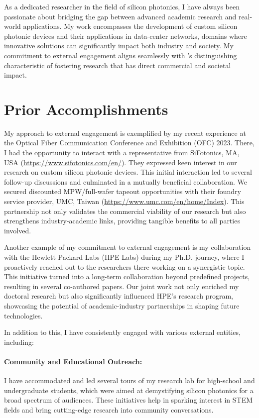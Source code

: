 As a dedicated researcher in the field of silicon photonics, I have always been passionate about bridging the gap between advanced academic research and real-world applications. My work encompasses the development of custom silicon photonic devices and their applications in data-center networks,  domains where innovative solutions can significantly impact both industry and society. My commitment to external engagement aligns seamlessly with \appSchool{}'s distinguishing characteristic of fostering research that has direct commercial and societal impact.

\section{Prior Accomplishments}
My approach to external engagement is exemplified by my recent experience at the Optical Fiber Communication Conference and Exhibition (OFC) 2023. There, I had the opportunity to interact with a representative from SiFotonics, MA, USA (\url{https://www.sifotonics.com/en/}). They expressed keen interest in our research on custom silicon photonic devices. This initial interaction led to several follow-up discussions and culminated in a mutually beneficial collaboration. We secured discounted MPW/full-wafer tapeout opportunities with their foundry service provider, UMC, Taiwan (\url{https://www.umc.com/en/home/Index}). This partnership not only validates the commercial viability of our research but also strengthens industry-academic links, providing tangible benefits to all parties involved.

Another example of my commitment to external engagement is my collaboration with the Hewlett Packard Labs (HPE Labs) during my Ph.D. journey, where I proactively reached out to the researchers there working on a synergistic topic. This initiative turned into a long-term collaboration beyond predefined projects, resulting in several co-authored papers. Our joint work not only enriched my doctoral research but also significantly influenced HPE's research program, showcasing the potential of academic-industry partnerships in shaping future technologies.

In addition to this, I have consistently engaged with various external entities, including:

\paragraph{Community and Educational Outreach:} I have accommodated and led several tours of my research lab for high-school and undergraduate students, which were aimed at demystifying silicon photonics for a broad spectrum of audiences. These initiatives help in sparking interest in STEM fields and bring cutting-edge research into community conversations.

